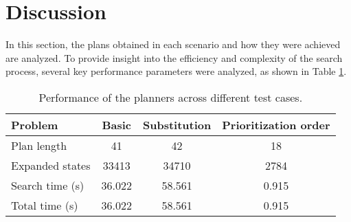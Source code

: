\section{Discussion}
In this section, the plans obtained in each scenario and how they were achieved are analyzed. To provide insight into the 
efficiency and complexity of the search process, several key performance parameters were analyzed, as shown in Table \ref{tabla}. 

\begin{table}[H]
    \centering
    \begin{tabular}{|l|c|c|c|}
    \hline
    Problem         & Basic & Substitution & Prioritization order \\ \hline
    Plan length     &  41     &    42          &        18            \\ \hline
    Expanded states &  33413  &  34710         &  2784               \\ \hline
    Search time (s) & 36.022  &  58.561        &  0.915             \\ \hline
    Total time (s)  & 36.022  &  58.561        & 0.915             \\ \hline
    \end{tabular}
    \caption{Performance of the planners across different test cases.}
    \label{tabla}
\end{table}
